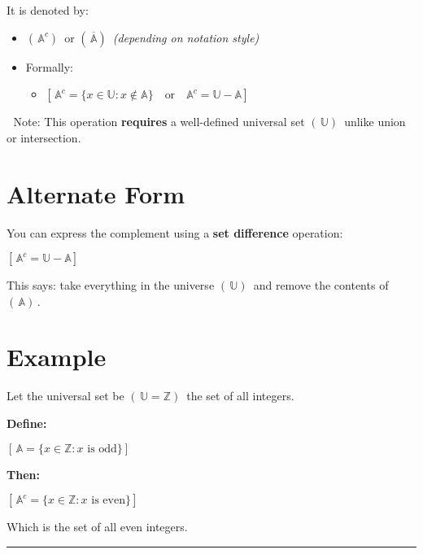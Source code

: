 \documentclass[
  letterpaper,
  DIV=11,
  numbers=noendperiod]{scrreprt}
\providecommand{\tightlist}{%
  \setlength{\itemsep}{0pt}\setlength{\parskip}{0pt}}
\begin{document}
It is denoted by:

\begin{itemize}
\item
  \((\, \mathbb{A}^c )\,\) or \((\, \overline{\mathbb{A}} )\,\)
  \emph{(depending on notation style)}
\item
  Formally:

  \begin{itemize}
  \tightlist
  \item
    \([\, \mathbb{A}^c = \{ x \in \mathbb{U} : x \notin \mathbb{A} \} \quad \text{or} \quad \mathbb{A}^c = \mathbb{U} - \mathbb{A}]\,\)
  \end{itemize}
\end{itemize}

📘 Note: This operation \textbf{requires} a well-defined universal set
\((\, \mathbb{U} )\,\) unlike union or intersection.

\section{Alternate Form}

You can express the complement using a \textbf{set difference}
operation:

\([\, \mathbb{A}^c = \mathbb{U} - \mathbb{A} ]\,\)

This says: take everything in the universe \(( \, \mathbb{U} ) \,\) and
remove the contents of \(( \, \mathbb{A} ) \,\).

\section{Example}

Let the universal set be \(( \, \mathbb{U} = \mathbb{Z} ) \,\) the set
of all integers.

\textbf{Define:}

\([ \, \mathbb{A} = \{ x \in \mathbb{Z} : x \text{ is odd} \} ] \,\)

\textbf{Then:}

\([ \, \mathbb{A}^c = \{ x \in \mathbb{Z} : x \text{ is even} \} ] \,\)

Which is the set of all even integers.

\begin{center}\rule{0.5\linewidth}{0.5pt}\end{center}
\end{document}
